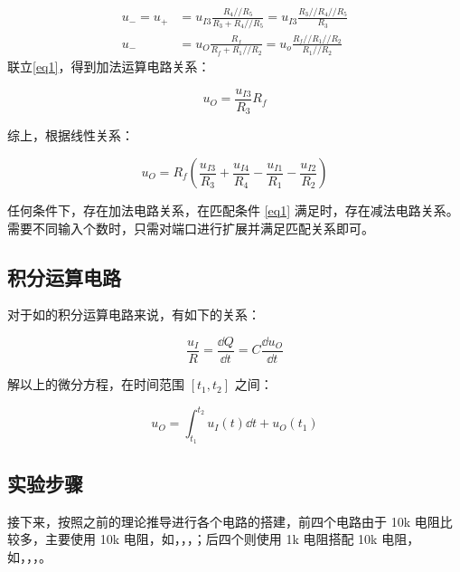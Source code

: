 \documentclass[lang=cn,11pt,a4paper,cite=authoryear]{elegantpaper}
\begin{document}
\begin{equation}
    \begin{aligned}
        u_{-} = u_{+} &= u_{I3} \frac{R_4 // R_5}{R_3 + R_4 // R_5} = u_{I3} \frac{R_3 // R_4 // R_5}{R_3} \\
        u_{-} &= u_{O} \frac{R_f}{R_f + R_1 // R_2} = u_{o} \frac{R_f // R_1 // R_2}{R_1 // R_2}
    \end{aligned}
\end{equation}
联立\eqref{eq1}，得到加法运算电路关系：

\begin{equation}
    u_O = \frac{u_{I3}}{R_3} R_f 
\end{equation}

综上，根据线性关系：

\begin{equation}
    u_{O}=R_{f}\left(\frac{u_{I 3}}{R_{3}}+\frac{u_{I 4}}{R_{4}}-\frac{u_{I 1}}{R_{1}}-\frac{u_{I 2}}{R_{2}}\right)
\end{equation}

任何条件下，存在加法电路关系，在匹配条件 \eqref{eq1} 满足时，存在减法电路关系。需要不同输入个数时，只需对端口进行扩展并满足匹配关系即可。

\subsection{积分运算电路}


对于如的积分运算电路来说，有如下的关系：

\begin{equation}
    \frac{u_I}{R} = \frac{\dd{Q}}{\dd{t}} = C \frac{\dd{u_O}}{\dd{t}}
\end{equation}

解以上的微分方程，在时间范围 \([t_1, t_2]\) 之间：

\begin{equation}
    u_O = \int_{t_1}^{t_2} u_I(t) \dd{t} + u_O(t_1)
\end{equation}


\subsection{实验步骤}

接下来，按照之前的理论推导进行各个电路的搭建，前四个电路由于 10k 电阻比较多，主要使用 10k 电阻，如，，，；后四个则使用 1k 电阻搭配 10k 电阻，如，，，。
\end{document}
